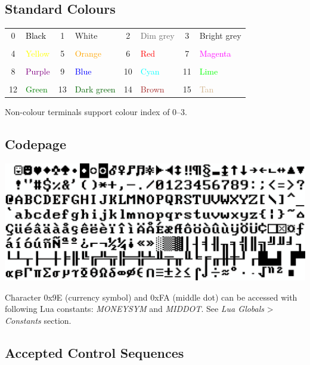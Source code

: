 \subsection{Standard Colours}

\begin{tabularx}{\textwidth}{c l c l c l c l}
	0 & \textcolor{black}{Black} & 1 & White & 2 & \textcolor{dimgrey}{Dim grey} & 3 & \textcolor{brightgrey}{Bright grey}
	\\ \\
	4 & \textcolor{yellow}{Yellow} & 5 & \textcolor{orange}{Orange} & 6 & \textcolor{red}{Red} & 7 & \textcolor{magenta}{Magenta}
	\\ \\
	8 & \textcolor{purple}{Purple} & 9 & \textcolor{blue}{Blue} & 10 & \textcolor{cyan}{Cyan} & 11 & \textcolor{lime}{Lime}
	\\ \\
	12 & \textcolor{green}{Green} & 13 & \textcolor{darkgreen}{Dark green} & 14 & \textcolor{brown}{Brown} & 15 & \textcolor{tan}{Tan}
\end{tabularx}

Non-colour terminals support colour index of 0--3.

\subsection{Codepage}

\newlength{\cpimagew}
\setlength{\cpimagew}{\linewidth}
\addtolength{\cpimagew}{-4em}

\begin{center}\includegraphics[width=\cpimagew]{mda.png}\end{center}

Character 0x9E (currency symbol) and 0xFA (middle dot) can be accessed with following Lua constants: \emph{MONEYSYM} and \emph{MIDDOT}. See \emph{Lua Globals} > \emph{Constants} section.

\subsection{Accepted Control Sequences}

